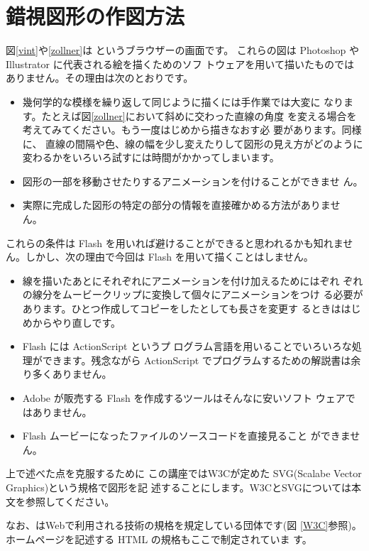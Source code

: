 \section*{錯視図形の作図方法}
図\ref{vint}や\ref{zollner}は \Opera というブラウザーの画面です。
これらの図は Photoshop や Illustrator に代表される絵を描くためのソフ
トウェアを用いて描いたものではありません。その理由は次のとおりです。
\begin{itemize}
 \item 幾何学的な模様を繰り返して同じように描くには手作業では大変に
       なります。たとえば図\ref{zollner}において斜めに交わった直線の角度
       を変える場合を考えてみてください。もう一度はじめから描きなおす必
       要があります。同様に、
       直線の間隔や色、線の幅を少し変えたりして図形の見え方がどのように
       変わるかをいろいろ試すには時間がかかってしまいます。
 \item 図形の一部を移動させたりするアニメーションを付けることができませ
       ん。
 \item 実際に完成した図形の特定の部分の情報を直接確かめる方法がありませ
       ん。
\end{itemize}
これらの条件は Flash を用いれば避けることができると思われるかも知れませ
ん。しかし、次の理由で今回は Flash を用いて描くことはしません。
\begin{itemize}
 \item 線を描いたあとにそれぞれにアニメーションを付け加えるためにはぞれ
       ぞれの線分をムービークリップに変換して個々にアニメーションをつけ
       る必要があります。ひとつ作成してコピーをしたとしても長さを変更す
       るときははじめからやり直しです。
 \item  Flash には ActionScript というプ
       ログラム言語を用いることでいろいろな処理ができます。残念ながら
       ActionScript でプログラムするための解説書は余り多くありません。
 \item Adobe が販売する Flash を作成するツールはそんなに安いソフト
       ウェアではありません。
 \item Flash ムービーになったファイルのソースコードを直接見ること
       ができません。
\end{itemize}
上で述べた点を克服するために
この講座ではW3Cが定めた SVG(Scalabe Vector Graphics)という規格で図形を記
述することにします。W3CとSVGについては本文を参照してください。
\iffalse\footnote{図形をプログラムで記述するのであれば
PostScript という選択もあります。残念ながら PostScript はグラディエー
ションやアニメーションを利用できないので今回の候補からはずしました。
このテキストの表示のフィックの渦巻き錯視は PostScript を用いて描いていま
す。}
\fi
\iffalse
なお、はWebで利用される技術の規格を規定している団体です(図
\ref{W3C}参照)。ホームページを記述する HTML の規格もここで制定されていま
す。


